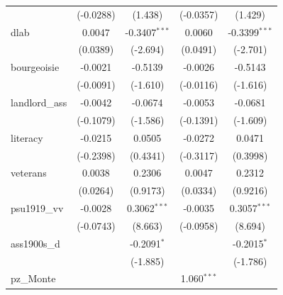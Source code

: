\begin{table}[htbp]
\begin{tabular}{lcccc}
                                       & (-0.0288)             & (1.438)                & (-0.0357)            & (1.429)\\   
      dlab                             & 0.0047                & -0.3407$^{***}$        & 0.0060               & -0.3399$^{***}$\\   
                                       & (0.0389)              & (-2.694)               & (0.0491)             & (-2.701)\\   
      bourgeoisie                      & -0.0021               & -0.5139                & -0.0026              & -0.5143\\   
                                       & (-0.0091)             & (-1.610)               & (-0.0116)            & (-1.616)\\   
      landlord\_ass                    & -0.0042               & -0.0674                & -0.0053              & -0.0681\\   
                                       & (-0.1079)             & (-1.586)               & (-0.1391)            & (-1.609)\\   
      literacy                         & -0.0215               & 0.0505                 & -0.0272              & 0.0471\\   
                                       & (-0.2398)             & (0.4341)               & (-0.3117)            & (0.3998)\\   
      veterans                         & 0.0038                & 0.2306                 & 0.0047               & 0.2312\\   
                                       & (0.0264)              & (0.9173)               & (0.0334)             & (0.9216)\\   
      psu1919\_vv                      & -0.0028               & 0.3062$^{***}$         & -0.0035              & 0.3057$^{***}$\\   
                                       & (-0.0743)             & (8.663)                & (-0.0958)            & (8.694)\\   
      ass1900s\_d                      &                       & -0.2091$^{*}$          &                      & -0.2015$^{*}$\\   
                                       &                       & (-1.885)               &                      & (-1.786)\\   
      pz\_Monte                        &                       &                        & 1.060$^{***}$        &   \\   

\end{tabular}
\end{table}
